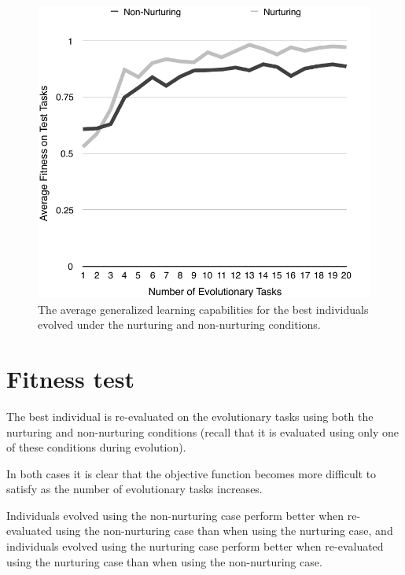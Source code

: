 \documentclass[master]{outhesis}
\begin{document}
\begin{figure}[H]
	\centering
	\includegraphics{ChalmersLearningTest.pdf}
	\caption{The average generalized learning capabilities for the best individuals evolved under the nurturing and non-nurturing conditions.}
\end{figure}

\section{Fitness test}

The best individual is re-evaluated on the evolutionary tasks using both the nurturing and non-nurturing conditions (recall that it is evaluated using only one of these conditions during evolution).

In both cases it is clear that the objective function becomes more difficult to satisfy as the number of evolutionary tasks increases. 

Individuals evolved using the non-nurturing case perform better when re-evaluated using the non-nurturing case than when using the nurturing case, and individuals evolved using the nurturing case perform better when re-evaluated using the nurturing case than when using the non-nurturing case.
\end{document}
